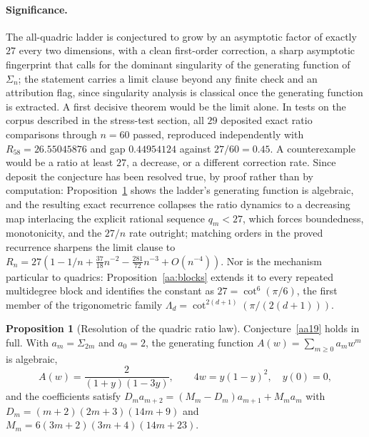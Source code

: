 \documentclass[11pt]{article}
\theoremstyle{definition}
\newtheorem{proposition}{Proposition}
\begin{document}
\paragraph{Significance.}
The all-quadric ladder is conjectured to grow by an asymptotic factor of exactly $27$ every two dimensions, with a clean first-order correction, a sharp asymptotic fingerprint that calls for the dominant singularity of the generating function of $\Sigma_n$; the statement carries a limit clause beyond any finite check and an attribution flag, since singularity analysis is classical once the generating function is extracted.  A first decisive theorem would be the limit alone.  In tests on the corpus described in the stress-test section, all $29$ deposited exact ratio comparisons through $n=60$ passed, reproduced independently with $R_{58}=26.55045876$ and gap $0.44954124$ against $27/60=0.45$.  A counterexample would be a ratio at least $27$, a decrease, or a different correction rate.  Since deposit the conjecture has been resolved true, by proof rather than by computation: Proposition~\ref{aa:quad} shows the ladder's generating function is algebraic, and the resulting exact recurrence collapses the ratio dynamics to a decreasing map interlacing the explicit rational sequence $q_m<27$, which forces boundedness, monotonicity, and the $27/n$ rate outright; matching orders in the proved recurrence sharpens the limit clause to $R_n=27(1-1/n+\tfrac{37}{18}n^{-2}-\tfrac{281}{72}n^{-3}+O(n^{-4}))$.  Nor is the mechanism particular to quadrics: Proposition~\ref{aa:blocks} extends it to every repeated multidegree block and identifies the constant as $27=\cot^6(\pi/6)$, the first member of the trigonometric family $\Lambda_d=\cot^{2(d+1)}(\pi/(2(d+1)))$.

\begin{proposition}[Resolution of the quadric ratio law]\label{aa:quad}
Conjecture~\ref{aa19} holds in full.  With $a_m=\Sigma_{2m}$ and $a_0=2$, the generating function $A(w)=\sum_{m\ge0}a_mw^m$ is algebraic,
\[
A(w)=\frac{2}{(1+y)(1-3y)},\qquad 4w=y(1-y)^2,\quad y(0)=0,
\]
and the coefficients satisfy $D_ma_{m+2}=(M_m-D_m)a_{m+1}+M_ma_m$ with $D_m=(m+2)(2m+3)(14m+9)$ and $M_m=6(3m+2)(3m+4)(14m+23)$.
\end{proposition}
\end{document}
